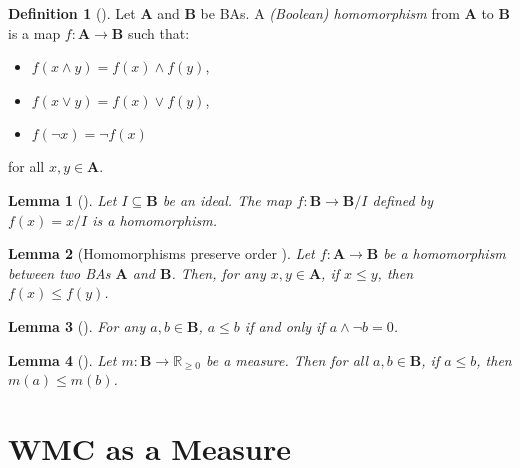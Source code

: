 \documentclass{article}
\newtheorem{lemma}{Lemma}
\theoremstyle{definition}
\newtheorem{definition}{Definition}
\theoremstyle{remark}
\begin{document}
\begin{definition}[\cite{givant2008introduction}]
  Let $\mathbf{A}$ and $\mathbf{B}$ be BAs. A \emph{(Boolean) homomorphism} from
  $\mathbf{A}$ to $\mathbf{B}$ is a map $f\colon \mathbf{A} \to \mathbf{B}$ such
  that:
  \begin{itemize}
  \item $f(x \land y) = f(x) \land f(y)$,
  \item $f(x \lor y) = f(x) \lor f(y)$,
  \item $f(\neg x) = \neg f(x)$
  \end{itemize}
  for all $x, y \in \mathbf{A}$.
\end{definition}

\begin{lemma}[\cite{givant2008introduction}] \label{lemma:canonical_homomorphism}
  Let $I \subseteq \mathbf{B}$ be an ideal. The map $f\colon \mathbf{B} \to
  \mathbf{B}/I$ defined by $f(x) = x/I$ is a homomorphism.
\end{lemma}

\begin{lemma}[Homomorphisms preserve order
  \cite{givant2008introduction}] \label{lemma:homomorphisms_and_order}
  Let $f\colon \mathbf{A} \to \mathbf{B}$ be a homomorphism between two BAs
  $\mathbf{A}$ and $\mathbf{B}$. Then, for any $x, y \in \mathbf{A}$, if $x \le
  y$, then $f(x) \le f(y)$.
\end{lemma}

\begin{lemma}[\cite{sikorski1969boolean}] \label{lemma:order}
  For any $a, b \in \mathbf{B}$, $a \le b$ if and only if $a \land \neg b = 0$.
\end{lemma}

\begin{lemma}[\cite{givant2008introduction}] \label{lemma:measure_and_order}
  Let $m\colon \mathbf{B} \to \mathbb{R}_{\ge 0}$ be a measure. Then for all $a,
  b \in \mathbf{B}$, if $a \le b$, then $m(a) \le m(b)$.
\end{lemma}

\section{WMC as a Measure}
\end{document}
